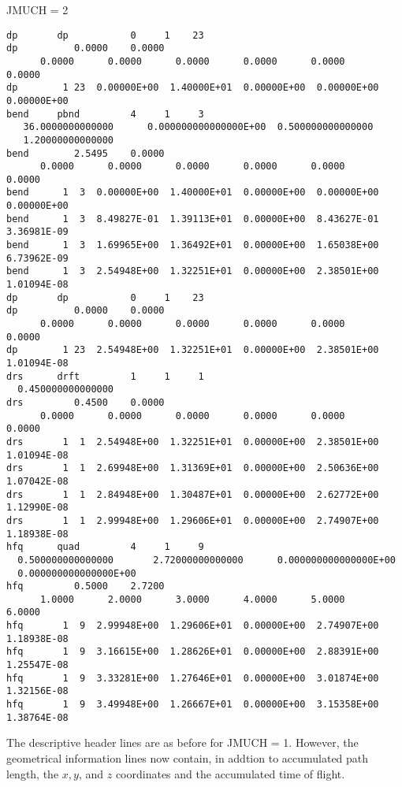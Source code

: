 JMUCH = 2

\begin{footnotesize}
\begin{verbatim}
dp       dp           0     1    23
dp          0.0000    0.0000
      0.0000      0.0000      0.0000      0.0000      0.0000      0.0000
dp        1 23  0.00000E+00  1.40000E+01  0.00000E+00  0.00000E+00  0.00000E+00
bend     pbnd         4     1     3
   36.0000000000000      0.000000000000000E+00  0.500000000000000
   1.20000000000000
bend        2.5495    0.0000
      0.0000      0.0000      0.0000      0.0000      0.0000      0.0000
bend      1  3  0.00000E+00  1.40000E+01  0.00000E+00  0.00000E+00  0.00000E+00
bend      1  3  8.49827E-01  1.39113E+01  0.00000E+00  8.43627E-01  3.36981E-09
bend      1  3  1.69965E+00  1.36492E+01  0.00000E+00  1.65038E+00  6.73962E-09
bend      1  3  2.54948E+00  1.32251E+01  0.00000E+00  2.38501E+00  1.01094E-08
dp       dp           0     1    23
dp          0.0000    0.0000
      0.0000      0.0000      0.0000      0.0000      0.0000      0.0000
dp        1 23  2.54948E+00  1.32251E+01  0.00000E+00  2.38501E+00  1.01094E-08
drs      drft         1     1     1
  0.450000000000000
drs         0.4500    0.0000
      0.0000      0.0000      0.0000      0.0000      0.0000      0.0000
drs       1  1  2.54948E+00  1.32251E+01  0.00000E+00  2.38501E+00  1.01094E-08
drs       1  1  2.69948E+00  1.31369E+01  0.00000E+00  2.50636E+00  1.07042E-08
drs       1  1  2.84948E+00  1.30487E+01  0.00000E+00  2.62772E+00  1.12990E-08
drs       1  1  2.99948E+00  1.29606E+01  0.00000E+00  2.74907E+00  1.18938E-08
hfq      quad         4     1     9
  0.500000000000000       2.72000000000000      0.000000000000000E+00
  0.000000000000000E+00
hfq         0.5000    2.7200
      1.0000      2.0000      3.0000      4.0000      5.0000      6.0000
hfq       1  9  2.99948E+00  1.29606E+01  0.00000E+00  2.74907E+00  1.18938E-08
hfq       1  9  3.16615E+00  1.28626E+01  0.00000E+00  2.88391E+00  1.25547E-08
hfq       1  9  3.33281E+00  1.27646E+01  0.00000E+00  3.01874E+00  1.32156E-08
hfq       1  9  3.49948E+00  1.26667E+01  0.00000E+00  3.15358E+00  1.38764E-08
\end{verbatim}
\end{footnotesize}

\noindent The descriptive header lines are as before for JMUCH = 1.  However, the
geometrical information lines now contain, in addtion to accumulated path
length, the $x,y$, and $z$ coordinates and the accumulated time of
flight. \\

